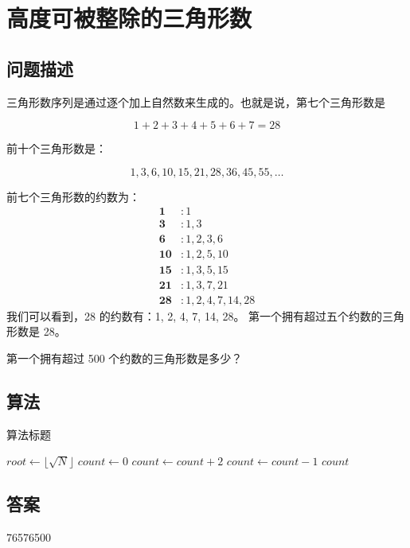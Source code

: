 \section{高度可被整除的三角形数}
\subsection{问题描述}
\begin{tcolorbox}
	三角形数序列是通过逐个加上自然数来生成的。也就是说，第七个三角形数是

	\[
		1 + 2 + 3 + 4 + 5 + 6 + 7 = 28
	\]

	前十个三角形数是：

	\[
		1, 3, 6, 10, 15, 21, 28, 36, 45, 55, \ldots
	\]


	前七个三角形数的约数为：
	\begin{align*}
		\mathbf 1   & \colon 1             \\
		\mathbf 3   & \colon 1,3           \\
		\mathbf 6   & \colon 1,2,3,6       \\
		\mathbf{10} & \colon 1,2,5,10      \\
		\mathbf{15} & \colon 1,3,5,15      \\
		\mathbf{21} & \colon 1,3,7,21      \\
		\mathbf{28} & \colon 1,2,4,7,14,28
	\end{align*}
	我们可以看到，28 的约数有：1, 2, 4, 7, 14, 28。
	第一个拥有超过五个约数的三角形数是 28。

	第一个拥有超过 500 个约数的三角形数是多少？
\end{tcolorbox}

\subsection{算法}
\begin{algorithm}[H]
	\caption{算法标题}
	\begin{algorithmic}[1]
	\State $root \gets \lfloor \sqrt{N} \rfloor$
	\State $ count \gets 0$
	\State $count \gets count + 2$
	\EndFor
	\State $count \gets count - 1$
	\EndIf
	\Return $count$
	\EndFunction
	\end{algorithmic}
\end{algorithm}

\subsection{答案}
76576500

